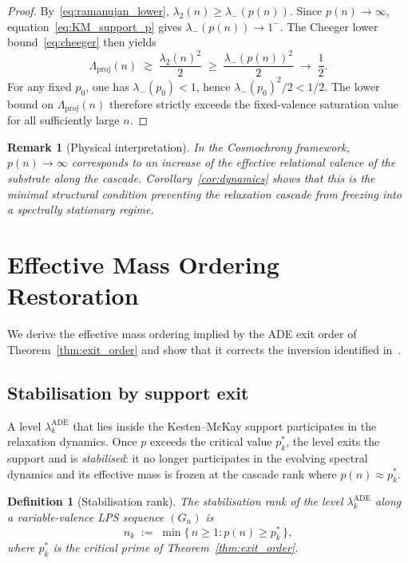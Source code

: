 \documentclass[11pt]{article}
\newtheorem{definition}[theorem]{Definition}
\newtheorem{remark}[theorem]{Remark}
\newcommand{\Lproj}{\Lambda_{\mathrm{proj}}}
\newcommand{\lADE}[1]{\lambda_{#1}^{\mathrm{ADE}}}
\begin{document}
    \begin{proof}
      By~\eqref{eq:ramanujan_lower}, $\lambda_2(n) \geq \lambda_-(p(n))$.
      Since $p(n) \to \infty$, equation~\eqref{eq:KM_support_p} gives
      $\lambda_-(p(n)) \to 1^-$.
      The Cheeger lower bound~\eqref{eq:cheeger} then yields
      \[
        \Lproj(n) \;\gtrsim\; \frac{\lambda_2(n)^2}{2}
        \;\geq\; \frac{\lambda_-(p(n))^2}{2} \;\longrightarrow\; \frac{1}{2}.
      \]
      For any fixed $p_0$, one has $\lambda_-(p_0) < 1$, hence
      $\lambda_-(p_0)^2/2 < 1/2$.
      The lower bound on $\Lproj(n)$ therefore strictly exceeds the fixed-valence
      saturation value for all sufficiently large $n$.
    \end{proof}

    \begin{remark}[Physical interpretation]
  In the Cosmochrony framework, $p(n) \to \infty$ corresponds to an increase of the
  effective relational valence of the substrate along the cascade.
  Corollary~\ref{cor:dynamics} shows that this is the minimal structural
  condition preventing the relaxation cascade from freezing into a spectrally
  stationary regime.
    \end{remark}

  \section{Effective Mass Ordering Restoration}
  \label{sec:mass_ordering}


  We derive the effective mass ordering implied by the ADE exit order of
  Theorem~\ref{thm:exit_order} and show that it corrects the inversion
  identified in~\cite{Beau2026a5}.

  \subsection{Stabilisation by support exit}
    \label{subsec:stabilisation}

    A level $\lADE{k}$ that lies inside the Kesten--McKay support participates in
    the relaxation dynamics.
    Once $p$ exceeds the critical value $p_k^*$, the level exits the support and
    is \emph{stabilised}: it no longer participates in the evolving spectral
    dynamics and its effective mass is frozen at the cascade rank where
    $p(n) \approx p_k^*$.

    \begin{definition}[Stabilisation rank]
      \label{def:stabilisation_rank}
      The \emph{stabilisation rank} of the level $\lADE{k}$ along a
      variable-valence LPS sequence $(G_n)$ is
      \begin{equation}
        n_k \;:=\; \min\bigl\{\,n \geq 1 : p(n) \geq p_k^*\,\bigr\},
        \label{eq:stab_rank}
      \end{equation}
      where $p_k^*$ is the critical prime of Theorem~\ref{thm:exit_order}.
    \end{definition}
\end{document}
